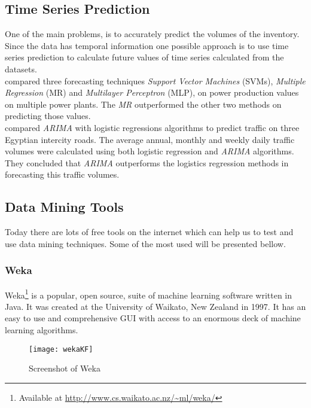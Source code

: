 \subsection{Time Series Prediction}\label{sec:tsp}
One of the main problems, is to accurately predict the volumes of the inventory.
Since the data has temporal information one possible approach is to use time
series prediction to calculate future values of time series calculated from the
datasets.
\\

\cite{1716527} compared three forecasting techniques \emph{Support Vector
Machines} (SVMs), \emph{Multiple Regression} (MR) and \emph{Multilayer
Perceptron} (MLP), on power production values on multiple power plants. The
\emph{MR} outperformed the other two methods on predicting those values.
\\

\cite{Sabry:2007kq} compared \emph{ARIMA} with logistic regressions algorithms
to predict traffic on three Egyptian intercity roads. The average annual,
monthly and weekly daily traffic volumes were calculated using both logistic
regression and \emph{ARIMA} algorithms. They concluded that \emph{ARIMA} outperforms the
logistics regression methods in forecasting this traffic volumes.

\subsection{Data Mining Tools}
Today there are lots of free tools on the internet which can help us to test and use data mining techniques.
Some of the most used will be presented bellow.

\subsubsection{Weka}

Weka\footnote{ Available at \url{http://www.cs.waikato.ac.nz/~ml/weka/}} is a popular, open source, suite of machine learning software written in Java.
It was created at the University of Waikato, New Zealand in 1997. It has an easy to use and comprehensive GUI with access to an enormous deck of machine learning algorithms.

\begin{figure}[h]
  \begin{center}
    \leavevmode
    \texttt{[image: wekaKF]}
    \caption{Screenshot of Weka \protect\footnotemark}
    \label{fig:RapidMiner}
  \end{center}
\end{figure}


